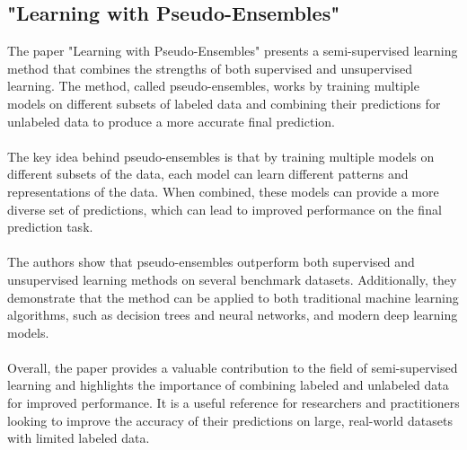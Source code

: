 \documentclass[paper=a4, fontsize=11pt]{scrartcl}
\numberwithin{equation}{section}		%
\numberwithin{figure}{section}			%
\numberwithin{table}{section}				%
\begin{document}
\subsection{"Learning with Pseudo-Ensembles" \cite{Learning with pseudo-ensembles}}
The paper "Learning with Pseudo-Ensembles" presents a semi-supervised learning method that combines the strengths of both supervised and unsupervised learning. The method, called pseudo-ensembles, works by training multiple models on different subsets of labeled data and combining their predictions for unlabeled data to produce a more accurate final prediction.
\\
\\
The key idea behind pseudo-ensembles is that by training multiple models on different subsets of the data, each model can learn different patterns and representations of the data. When combined, these models can provide a more diverse set of predictions, which can lead to improved performance on the final prediction task.
\\
\\
The authors show that pseudo-ensembles outperform both supervised and unsupervised learning methods on several benchmark datasets. Additionally, they demonstrate that the method can be applied to both traditional machine learning algorithms, such as decision trees and neural networks, and modern deep learning models.
\\
\\
Overall, the paper provides a valuable contribution to the field of semi-supervised learning and highlights the importance of combining labeled and unlabeled data for improved performance. It is a useful reference for researchers and practitioners looking to improve the accuracy of their predictions on large, real-world datasets with limited labeled data.
\end{document}
